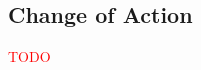 \documentclass[11pt,a4paper]{article}
\makeatletter
\theoremstyle{plain}
\theoremstyle{definition}
\newcommand{\id}{\mathrm{id}}
\providecommand{\leftsquigarrow}{%
  \mathrel{\mathpalette\reflect@squig\relax}%
}
\newcommand{\reflect@squig}[2]{%
  \reflectbox{$\m@th#1\rightsquigarrow$}%
}
\newcommand{\todo}[1]{\textcolor{red}{\small #1}}
\makeatother
\begin{document}
%
%
%

\subsection{Change of Action}

\todo{TODO}
\end{document}
